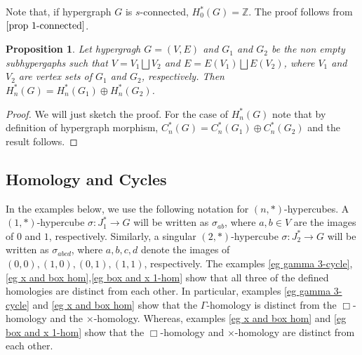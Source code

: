 \documentclass[11pt]{amsart}
\newtheorem{prop}[subsection]{Proposition}
\begin{document}
Note that, if hypergraph $G$ is $s$-connected, $H_0^*(G)=\mathbb{Z}$. The proof follows from $\ref{prop 1-connected}$.\\

\begin{prop}
	Let hypergragh $G=(V,E)$ and $G_1$ and $G_2$ be the non empty subhypergaphs such that $V=V_1 \bigsqcup V_2$ and $E= E(V_1) \bigsqcup E(V_2)$, where $V_1$ and $V_2$ are vertex sets of $G_1$ and $G_2$, respectively. Then $H_n^*(G)=H_n^*(G_1)\oplus H_n^*(G_2)$. 
\end{prop}
\begin{proof}
	We will just sketch the proof. For the case of $H_n^*(G)$ note that by definition of hypergraph morphism, $C_n^*(G)=C_n^*(G_1)\oplus C_n^*(G_2)$ and the result follows.
\end{proof}



%


\subsection{Homology and Cycles}

In the examples below, we use the following notation for $(n,*)$-hypercubes.
A $(1,*)$-hypercube $\sigma \colon J_1^* \to G$ will be written as
$\sigma_{ab}$, where $a,b\in V$ are the images of $0$ and $1$,
respectively.
Similarly, a singular $(2,*)$-hypercube $\sigma \colon J_2^* \to G$ will be written
as $\sigma_{abcd}$, where $a,b,c,d$ denote the images of
$(0,0),(1,0),(0,1),(1,1)$, respectively. The examples \ref{eg gamma 3-cycle},\ref{eg x and box hom},\ref{eg box and x 1-hom} show that all three of the defined homologies are distinct from each other. In particular, examples \ref{eg gamma 3-cycle} and \ref{eg x and box hom} show that the $\Gamma$-homology is distinct from the $\Box$-homology and the $\times$-homology. Whereas, examples \ref{eg x and box hom} and \ref{eg box and x 1-hom} show that the $\Box$-homology and $\times$-homology are distinct from each other.
\end{document}
